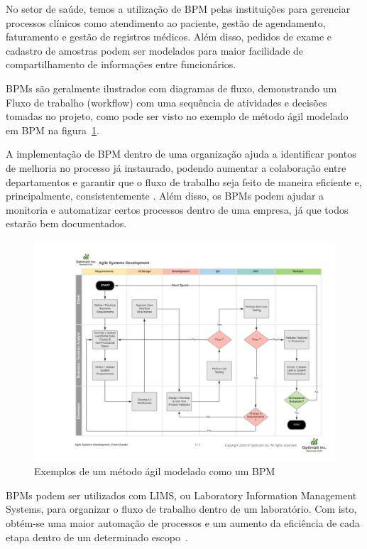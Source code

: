 

No setor de saúde, temos a utilização de BPM pelas instituições para gerenciar processos clínicos como atendimento ao paciente, gestão de agendamento, faturamento e gestão de registros médicos. Além disso, pedidos de exame e cadastro de amostras podem ser modelados para maior facilidade de compartilhamento de informações entre funcionários.


BPMs são geralmente ilustrados com diagramas de fluxo, demonstrando um Fluxo de trabalho (workflow) com uma sequência de atividades e decisões tomadas no projeto, como pode ser visto no exemplo de método ágil modelado em BPM na figura~\ref{fig:bpm}.

A implementação de BPM dentro de uma organização ajuda a identificar pontos de melhoria no processo já instaurado, podendo aumentar a colaboração entre departamentos e garantir que o fluxo de trabalho seja feito de maneira eficiente e, principalmente, consistentemente \R.
Além disso, os BPMs podem ajudar a monitoria e automatizar certos processos dentro de uma empresa, já que todos estarão bem documentados. \R

\begin{figure}
    \centering
    \includegraphics[width=1\textwidth]{imgs/BPM/sprint as bpm.png}
    \caption{Exemplos de um método ágil modelado como um BPM}
    \label{fig:bpm}
\end{figure}

BPMs podem ser utilizados com LIMS, ou Laboratory Information Management Systems, para organizar o fluxo de trabalho dentro de um laboratório. Com isto, obtém-se uma maior automação de processos e um aumento da eficiência de cada etapa dentro de um determinado escopo~\cite{Key2011LIMS:Systems}.

